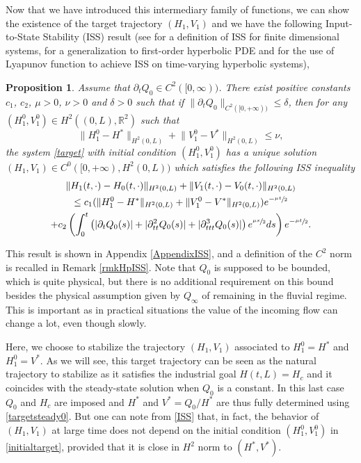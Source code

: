 \documentclass[11pt]{article}
\numberwithin{equation}{section}
\newtheorem{prop}[thm]{Proposition}
\theoremstyle{definition}
\begin{document}
Now that we have introduced this intermediary family of functions, we can show the existence of the target trajectory $(H_{1},V_{1})$ and
we have the following Input-to-State Stability (ISS) result {(see \cite{Sontag} for a definition of ISS for finite dimensional systems,
\cite[Chap.\,1, Chap.\,3]{IassonKrstic} for a generalization to first-order hyperbolic PDE and \cite{PrieurISS} for the use of Lyapunov function to achieve ISS on time-varying hyperbolic systems)},
\begin{prop}\label{propISS}
Assume that $\partial_{t}Q_{0}\in C^{2}([0,\infty))$. There exist positive constants $c_{1}$, $c_{2}$,
$\mu>0$, $\nu>0$ and $\delta>0$ such that if
$\lVert\partial_{t}Q_{0}\rVert_{C^{2}([0,+\infty))}\leq\delta$, then for any $(H_{1}^{0},V_{1}^{0})\in H^{2}((0,L),{\mathbb{R}^{2}})$ such that
\begin{equation*}
\lVert H_{1}^{0}-H^{*}\rVert_{H^{2}(0,L)}+\lVert V_{1}^{0}-V^{*}\rVert_{H^{2}(0,L)}\leq \nu,
\end{equation*}
the system \eqref{target} with initial condition $(H_{1}^{0},V_{1}^{0})$ has a unique solution $(H_{1},V_{1})\in C^{0}([0,+\infty),H^{2}(0,L))$ which satisfies the following ISS inequality
{\begin{multline}
\label{ISS}
\lVert H_{1}(t,\cdot)-H_{0}(t,\cdot)\rVert_{H^{2}(0,L)}+\lVert V_{1}(t,\cdot)-V_{0}(t,\cdot)\rVert_{H^{2}(0,L)}\\
\leq c_{1}(\lVert H_{1}^{0}-H^{*}\rVert_{H^{2}(0,L)}+\lVert V_{1}^{0}-V^{*}\rVert_{H^{2}(0,L)})e^{-\sfrac{\mu t}{2}}\\
+c_{2}\left(\int_{0}^{t}\left(|\partial_{t}Q_{0}(s)|+|\partial_{tt}^{2}Q_{0}(s)|+|\partial_{ttt}^{3}Q_{0}(s)|\right)e^{\sfrac{\mu s}{2}}ds\right)e^{-\sfrac{\mu t}{2}}.
\end{multline}}
\end{prop}
This result is shown in Appendix \ref{AppendixISS}, {and a definition of the $C^{2}$ norm is recalled in Remark \ref{rmkHpISS}}. Note that $Q_{0}$ is supposed to be bounded, which is quite physical, but there is no additional requirement on this bound besides the physical assumption given by $Q_{\infty}$ of remaining in the fluvial regime. This is important as in practical
situations the value of the incoming flow can change a lot, even though slowly.

Here, we {choose} to stabilize the trajectory $(H_{1},V_{1})$ associated to $H_{1}^{0}=H^{*}$ and $H_{1}^{0}=V^{*}$. As we will see, this target trajectory can be seen as the natural trajectory to stabilize as it satisfies the industrial goal $H(t,L)=H_{c}$
and it coincides with the steady-state solution when $Q_{0}$ is a constant.
{In this last case $Q_{0}$ and $H_{c}$ are imposed and $H^{*}$ and $V^{*}=Q_{0}/H^{*}$ are thus fully determined using \eqref{targetsteady0}.}
But one can note from \eqref{ISS} that, in fact, the behavior of $(H_{1},V_{1})$ at large time does not depend on the initial condition $(H_{1}^{0},V_{1}^{0})$ in \eqref{initialtarget}, provided that it is close in $H^{2}$ norm to $(H^{*},V^{*})$.
\end{document}
